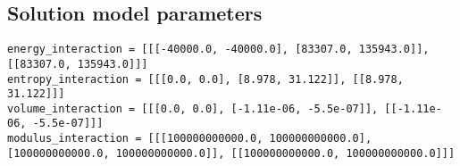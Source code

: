 \documentclass[11pt,a4paper,english]{article}
\begin{document}
\subsection{Solution model parameters}
\begin{lstlisting}
energy_interaction = [[[-40000.0, -40000.0], [83307.0, 135943.0]], [[83307.0, 135943.0]]]
entropy_interaction = [[[0.0, 0.0], [8.978, 31.122]], [[8.978, 31.122]]]
volume_interaction = [[[0.0, 0.0], [-1.11e-06, -5.5e-07]], [[-1.11e-06, -5.5e-07]]]
modulus_interaction = [[[100000000000.0, 100000000000.0], [100000000000.0, 100000000000.0]], [[100000000000.0, 100000000000.0]]]
\end{lstlisting}

\clearpage

\end{document}
